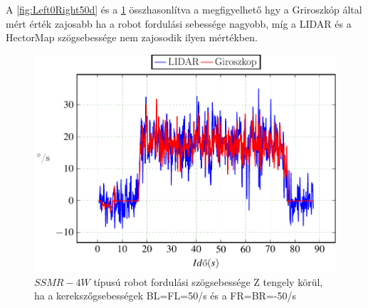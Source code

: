 A \ref{fig:Left0Right50d} és a \ref{fig:Left_n50Right50d} összhasonlítva a megfigyelhető hgy a Griroszkóp által mért érték zajosabb ha a robot fordulási sebessége nagyobb, míg a LIDAR és a HectorMap szögsebessége nem zajosodik ilyen mértékben.

\begin{figure}[H]
  \includegraphics{tikz/Left_n50Right50d.pdf}
  \caption{$SSMR-4W$ típusú robot fordulási szögsebessége Z tengely körül, ha a kerekszőgsebességek BL=FL=50\degree/s és a FR=BR=-50\degree/s}
    \label{fig:Left_n50Right50d}
\end{figure}









